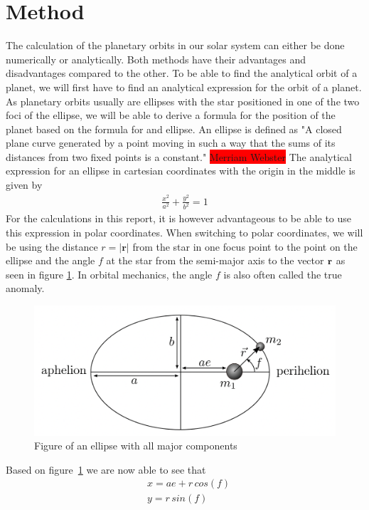 \documentclass[reprint,english,notitlepage]{revtex4-2}
\begin{document}
\section{Method}
The calculation of the planetary orbits in our solar system can either be done numerically or analytically.
Both methods have their advantages and disadvantages compared to the other.
To be able to find the analytical orbit of a planet, we will first have to find an analytical expression for the orbit of a planet.
As planetary orbits usually are ellipses with the star positioned in one of the two foci of the ellipse, we will be able to derive a formula for the position of the planet based on the formula for and ellipse.
An ellipse is defined as "A closed plane curve generated by a point moving in such a way that the sums of its distances from two fixed points is a constant." \colorbox{red}{Merriam Webster}
The analytical expression for an ellipse in cartesian coordinates with the origin in the middle is given by
\begin{align}
    \frac{x^2}{a^2} + \frac{y^2}{b^2} = 1 \label{ellipse_analytic_cart}
\end{align}
For the calculations in this report, it is however advantageous to be able to use this expression in polar coordinates.
When switching to polar coordinates, we will be using the distance $r = |\textbf{r}|$ from the star in one focus point to the point on the ellipse and the angle $f$ at the star from the semi-major axis to the vector $\bold{r}$ as seen in figure \ref{fig:Ellipse_fig}.
In orbital mechanics, the angle $f$ is also often called the true anomaly.
\begin{figure}[h]
	\centering
	\includegraphics[scale=0.3]{Figures/Ellipse}
	\caption{Figure of an ellipse with all major components}\label{fig:Ellipse_fig}
\end{figure}
Based on figure~\ref{fig:Ellipse_fig} we are now able to see that
\begin{align}
    &x = ae + r\,cos(f) \label{x_ellipse}\\
	&y = r\,sin(f) \label{y_ellipse}
\end{align}
\end{document}
